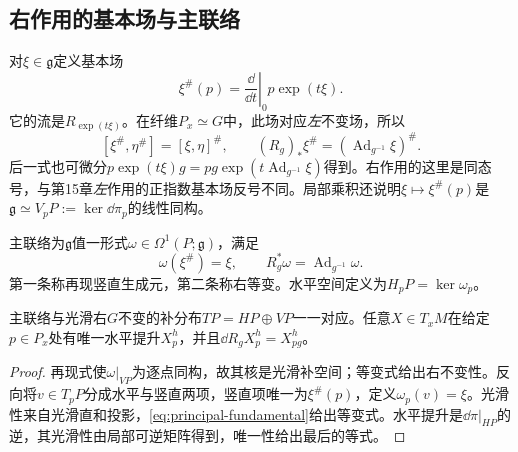 \subsection{右作用的基本场与主联络}
对$\xi\in\mathfrak g$定义基本场
\[
 \xi^\#(p)=\left.\frac{\dd}{\dd t}\right|_0p\exp(t\xi).
\]
它的流是$R_{\exp(t\xi)}$。在纤维$P_x\simeq G$中，此场对应\emph{左}不变场，所以
\begin{equation}\label{eq:principal-fundamental}
 [\xi^\#,\eta^\#]=[\xi,\eta]^\#,
 \qquad (R_g)_*\xi^\#=(\operatorname{Ad}_{g^{-1}}\xi)^\#.
\end{equation}
后一式也可微分$p\exp(t\xi)g=pg\exp(t\operatorname{Ad}_{g^{-1}}\xi)$得到。右作用的这里是同态号，与第15章\emph{左}作用的正指数基本场反号不同。局部乘积还说明$\xi\mapsto\xi^\#(p)$是$\mathfrak g\simeq V_pP:=\ker\dd\pi_p$的线性同构。

\begin{definition}\label{def:principal-connection}
主联络为$\mathfrak g$值一形式$\omega\in\Omega^1(P;\mathfrak g)$，满足
\begin{equation}\label{eq:principal-connection-axioms}
 \omega(\xi^\#)=\xi,\qquad R_g^*\omega=\operatorname{Ad}_{g^{-1}}\omega.
\end{equation}
第一条称再现竖直生成元，第二条称右等变。水平空间定义为$H_pP=\ker\omega_p$。
\end{definition}
\begin{proposition}\label{prop:principal-horizontal}
主联络与光滑右$G$不变的补分布$TP=HP\oplus VP$一一对应。任意$X\in T_xM$在给定$p\in P_x$处有唯一水平提升$X^h_p$，并且$\dd R_gX^h_p=X^h_{pg}$。
\end{proposition}
\begin{proof}
再现式使$\omega|_{VP}$为逐点同构，故其核是光滑补空间；等变式给出右不变性。反向将$v\in T_pP$分成水平与竖直两项，竖直项唯一为$\xi^\#(p)$，定义$\omega_p(v)=\xi$。光滑性来自光滑直和投影，\eqref{eq:principal-fundamental}给出等变式。水平提升是$\dd\pi|_{HP}$的逆，其光滑性由局部可逆矩阵得到，唯一性给出最后的等式。
\end{proof}

